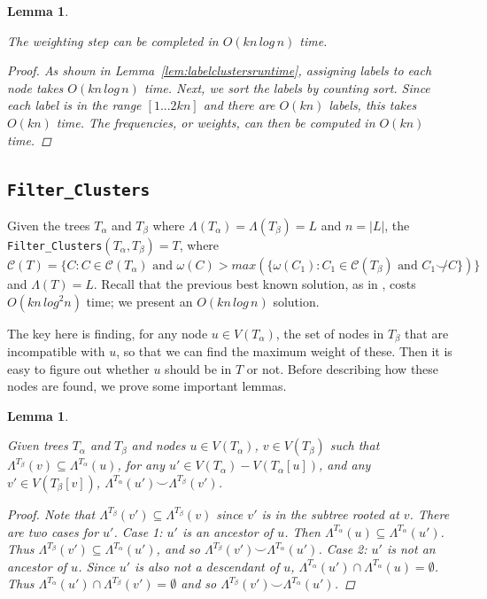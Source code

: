 \documentclass{article}
\newcommand{\compatible}{\smile}
\newcommand{\leafset}{\Lambda}
\newcommand{\weight}{\omega}
\newcommand{\TA}{T_\alpha}
\newcommand{\TB}{T_\beta}
\newtheorem{weightingruntime}[incompatibility]{Lemma}
\newtheorem{filterclusterssubsetcompatible}[incompatibility]{Lemma}
\begin{document}
    \medskip
    \begin{weightingruntime}
        \label{lem:weightingruntime}

        The weighting step can be completed in $O(kn\,log\,n)$ time.

        \begin{proof}
            As shown in Lemma~\ref{lem:labelclustersruntime}, assigning labels to each node takes $O(kn\,log\,n)$ time. Next, we sort the labels by counting sort. Since each label is in the range $[1 ... 2kn]$ and there are $O(kn)$ labels, this takes $O(kn)$ time. The frequencies, or weights, can then be computed in $O(kn)$ time.
        \end{proof}
    \end{weightingruntime}

    \subsection{\texttt{Filter\_Clusters}}
    \label{subsec:filterclusters}

    Given the trees $\TA$ and $\TB$ where $\leafset(\TA) = \leafset(\TB) = L$ and $n = |L|$, the \texttt{Filter\_Clusters}$(\TA, \TB) = T$, where $\mathcal{C}(T) = \{C : C \in \mathcal{C}(\TA) \text{ and } \weight(C) > max(\{\weight(C_1) : C_1 \in \mathcal{C}(\TB) \text{ and } C_1 \not\compatible C\})\}$ and $\leafset(T) = L$. Recall that the previous best known solution, as in \cite{jansson2018algorithms}, costs $O(kn\,log^2n)$ time; we present an $O(kn\,log\,n)$ solution.

    The key here is finding, for any node $u \in V(\TA)$, the set of nodes in $\TB$ that are incompatible with $u$, so that we can find the maximum weight of these. Then it is easy to figure out whether $u$ should be in $T$ or not. Before describing how these nodes are found, we prove some important lemmas.
    \newline

    \begin{filterclusterssubsetcompatible}
        \label{lem:filterclusterssubsetcompatible}

        Given trees $\TA$ and $\TB$ and nodes $u \in V(\TA)$, $v \in V(\TB)$ such that $\leafset^{\TB}(v) \subseteq \leafset^{\TA}(u)$, for any $u' \in V(\TA) - V(\TA[u])$, and any $v' \in V(\TB[v])$, $\leafset^{\TA}(u') \compatible \leafset^{\TB}(v')$.

        \begin{proof}
            Note that $\leafset^{\TB}(v') \subseteq \leafset^{\TB}(v)$ since $v'$ is in the subtree rooted at $v$. There are two cases for $u'$. \textit{Case 1}: $u'$ is an ancestor of $u$. Then $\leafset^{\TA}(u) \subseteq \leafset^{\TA}(u')$. Thus $\leafset^{\TB}(v') \subseteq \leafset^{\TA}(u')$, and so $\leafset^{\TB}(v') \compatible \leafset^{\TA}(u')$. \textit{Case 2}: $u'$ is not an ancestor of $u$. Since $u'$ is also not a descendant of $u$, $\leafset^{\TA}(u') \cap \leafset^{\TA}(u) = \emptyset$. Thus $\leafset^{\TA}(u') \cap \leafset^{\TB}(v') = \emptyset$ and so $\leafset^{\TB}(v') \compatible \leafset^{\TA}(u')$.
        \end{proof}
    \end{filterclusterssubsetcompatible}
\end{document}
